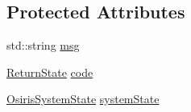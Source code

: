 \subsection*{Protected Attributes}
\begin{DoxyCompactItemize}
\item 
std\-::string \hyperlink{struct_osiris_i_1_1_events_1_1_osiris_i___system_event_a438c2c10282d5e116fdafd2fcae53029}{msg}
\item 
\hyperlink{namespace_osiris_i_a8f53bf938dc75c65c6a529694514013e}{Return\-State} \hyperlink{struct_osiris_i_1_1_events_1_1_osiris_i___system_event_ad8b3c9d8c313c3fcb274a0c716c03242}{code}
\item 
\hyperlink{namespace_osiris_i_1_1_events_a045d02c48bfbfffe08648c8d38a983b4}{Osiris\-System\-State} \hyperlink{struct_osiris_i_1_1_events_1_1_osiris_i___system_event_a7e10c133447ebc42ba7dcec23399b587}{system\-State}
\end{DoxyCompactItemize}


